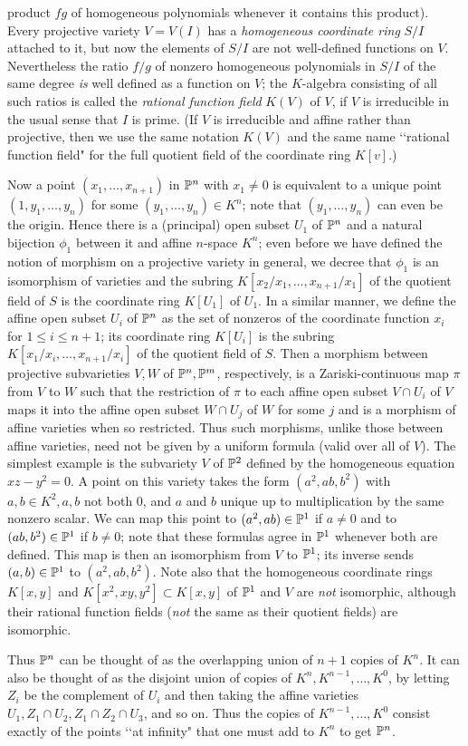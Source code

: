\documentclass[10pt]{article}
\begin{document}
product $fg$ of homogeneous polynomials whenever it contains this
product). Every projective variety $V=V(I)$ has a {\sl homogeneous
  coordinate ring} $S/I$ attached to it, but now the elements of $S/I$
are not well-defined functions on $V$. Nevertheless the ratio $f/g$ of
nonzero homogeneous polynomials in $S/I$ of the same degree {\sl is}
well defined as a function on $V$; the $K$-algebra consisting of all
such ratios is called the {\sl rational function field} $K(V)$ of $V$,
if $V$ is irreducible in the usual sense that $I$ is prime. (If $V$ is
irreducible and affine rather than projective, then we use the same
notation $K(V)$ and the same name \lq\lq rational function field" for
the full quotient field of the coordinate ring $K[v]$.)

Now a point $(x_1,\ldots,x_{n+1})$ in $\Bbb P^n$ with $x_1\ne0$ is
equivalent to a unique point $(1,y_1,\ldots,y_n)$ for some
$(y_1,\ldots,y_n)\in K^n$; note that $(y_1,\ldots,y_n)$ can even be the
origin. Hence there is a (principal) open subset $U_1$ of $\Bbb P^n$ and
a natural bijection $\phi_1$ between it and affine $n$-space $K^n$; even
before we have defined the notion of morphism on a projective variety in
general, we decree that $\phi_1$ is an isomorphism of varieties and the
subring $K[x_2/x_1,\ldots,x_{n+1}/x_1]$ of the quotient field of $S$ is
the coordinate ring $K[U_1]$ of $U_1$. In a similar manner, we define
the affine open subset $U_i$ of $\Bbb P^n$ as the set of nonzeros of the
coordinate function $x_i$ for $1\le i\le n+1$; its coordinate ring
$K[U_i]$ is the subring $K[x_1/x_i,\ldots,x_{n+1}/x_i]$ of the quotient
field of $S$. Then a morphism between projective subvarieties $V,W$ of
$\Bbb P^n,\Bbb P^m$, respectively, is a Zariski-continuous map $\pi$
from $V$ to $W$ such that the restriction of $\pi$ to each affine open
subset $V\cap U_i$ of $V$ maps it into the affine open subset $W\cap
U_j$ of $W$ for some $j$ and is a morphism of affine varieties when so
restricted. Thus such morphisms, unlike those between affine varieties,
need not be given by a uniform formula (valid over all of $V$). The
simplest example is the subvariety $V$ of $\Bbb P^2$ defined by the
homogeneous equation $xz - y^2 = 0$. A point on this variety takes the
form $(a^2,ab,b^2)$ with $a,b\in K^2, a,b$ not both 0, and $a$ and $b$
unique up to multiplication by the same nonzero scalar. We can map this
point to $(a^2,ab)\in\Bbb P^1$ if $a\ne0$ and to $(ab,b^2)\in\Bbb P^1$
if $b\ne0$; note that these formulas agree in $\Bbb P^1$ whenever both
are defined. This map is then an isomorphism from $V$ to $\Bbb P^1$; its
inverse sends $(a,b)\in\Bbb P^1$ to $(a^2,ab,b^2)$. Note also that the
homogeneous coordinate rings $K[x,y]$ and $K[x^2,xy,y^2]\subset K[x,y]$
of $\Bbb P^1$ and $V$ are {\sl not} isomorphic, although their rational
function fields ({\sl not} the same as their quotient fields) are
isomorphic.

Thus $\Bbb P^n$ can be thought of as the overlapping union of $n+1$
copies of $K^n$. It can also be thought of as the disjoint union of
copies of $K^n,K^{n-1},\ldots,K^0$, by letting $Z_i$ be the complement
of $U_i$ and then taking the affine varieties $U_1,Z_1\cap U_2, Z_1\cap
Z_2\cap U_3$, and so on. Thus the copies of $K^{n-1},\ldots,K^0$ consist
exactly of the points \lq\lq at infinity" that one must add to $K^n$ to
get $\Bbb P^n$.
\end{document}
